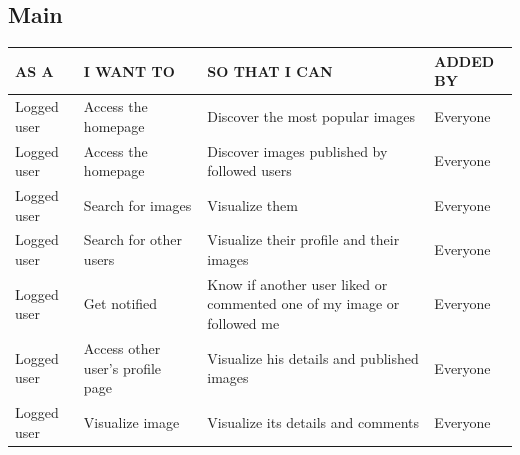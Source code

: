 \documentclass[11pt, a4paper]{article}
\begin{document}
\subsection{Main}
\begin{table}[H]
    \centering
    \begin{tabular}{|p{4cm}|p{4.5cm}|p{5cm}|p{3cm}|}
    \hline
    \rowcolor[HTML]{EFEFEF} 
    AS A        & I WANT TO                        & SO THAT I CAN                                  & ADDED BY \\ \hline
    Logged user & Access the homepage              & Discover the most popular images               & Everyone \\ \hline
    Logged user & Access the homepage              & Discover images published by followed users    & Everyone \\ \hline
    Logged user & Search for images                & Visualize them                                 & Everyone \\ \hline
    Logged user & Search for other users           & Visualize their profile and their images       & Everyone \\ \hline
    Logged user & Get notified                     & Know if another user liked or commented one of my image or followed me & Everyone \\ \hline
    Logged user & Access other user's profile page & Visualize his details and published images     & Everyone \\ \hline
    Logged user & Visualize image                  & Visualize its details and comments             & Everyone \\ \hline
    \end{tabular}
\end{table}
\begin{figure}[H]
    \centering
\end{figure}
\end{document}
